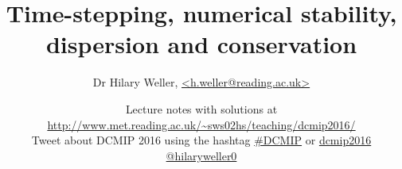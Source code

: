 
\title{Time-stepping, numerical stability, dispersion and conservation}


\author{Dr Hilary Weller, \url{<h.weller@reading.ac.uk>}}


\date{Lecture notes with solutions at\\
{\small{}\url{http://www.met.reading.ac.uk/~sws02hs/teaching/dcmip2016/}}\\
Tweet about DCMIP 2016 using the hashtag \url{\#DCMIP} or \url{dcmip2016}\\
\url{@hilaryweller0}}\maketitle

